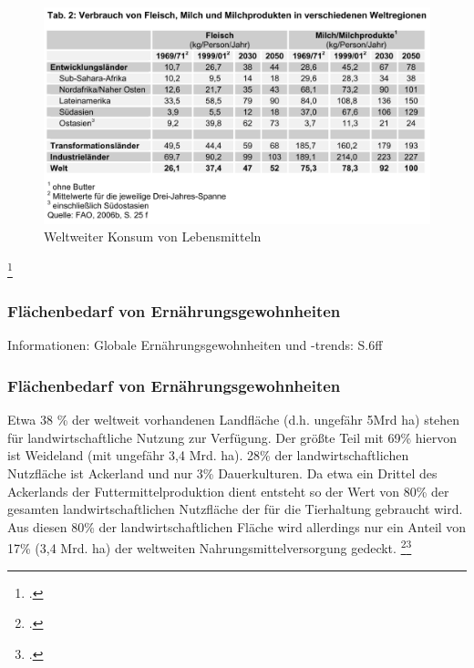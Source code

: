 \documentclass{scrartcl}
\begin{document}
\begin{figure}[htbp]
\centering
\includegraphics[width=16cm]{image_folder/KonsumWeltweit.png}
\caption{Weltweiter Konsum von Lebensmitteln}
\label{fig:konsumweltweit}
\end{figure}\footcite[S.4f]{VonKoerber2008Globale-trends}

\subsubsection{Flächenbedarf von Ernährungsgewohnheiten}
Informationen: Globale Ernährungsgewohnheiten und -trends: S.6ff

\subsubsection{Flächenbedarf von Ernährungsgewohnheiten}

Etwa 38 \% der weltweit vorhandenen Landfläche (d.h. ungefähr 5Mrd ha) stehen für landwirtschaftliche Nutzung zur Verfügung. Der größte Teil mit 69\% hiervon ist Weideland (mit ungefähr 3,4 Mrd. ha). 28\% der landwirtschaftlichen Nutzfläche ist Ackerland und nur 3\% Dauerkulturen.
Da etwa ein Drittel des Ackerlands der Futtermittelproduktion dient entsteht so der Wert von 80\% der gesamten landwirtschaftlichen Nutzfläche der für die Tierhaltung gebraucht wird. Aus diesen 80\% der landwirtschaftlichen Fläche wird allerdings nur ein Anteil von 17\% (3,4 Mrd. ha) der weltweiten Nahrungsmittelversorgung gedeckt. \footcite{2008FAOSTAT}\footcite[Vgl.][S.6]{VonKoerber2008Globale-trends}
\end{document}
